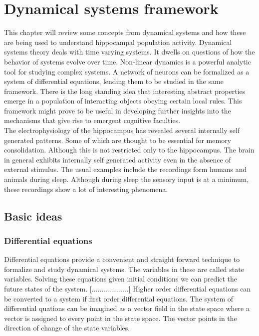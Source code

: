 
\chapter{Dynamical systems framework} %

\label{dynamics} %



This chapter will review some concepts from dynamical systems and how these are being used to understand hippocampal population activity. Dynamical systems theory deals with time varying systems. It dwells on questions of how the behavior of systems evolve over time. Non-linear dynamics is a powerful analytic tool for studying complex systems. A network of neurons can be formalized as a system of differential equations, lending them to be studied in the same framework. There is the long standing idea that interesting abstract properties emerge in a population of interacting objects obeying certain local rules. This framework might prove to be useful in developing further insights into the mechanisms that give rise to emergent cognitive faculties.\\
The electrophysiology of the hippocampus has revealed several internally self generated patterns. Some of which are thought to be essential for memory consolidation. Although this is not restricted only to the hippocampus. The brain in general exhibits internally self generated activity even in the absence of external stimulus. The usual examples include the recordings form humans and animals during sleep. Although during sleep the sensory input is at a minimum, these recordings show a lot of interesting phenomena.
 
\section{Basic ideas}

\subsection{Differential equations}
Differential equations provide a convenient and straight forward technique to formalize and study dynamical systems. 
The variables in these are called state variables. Solving these equations given initial conditions we can predict the future states of the system.
[...................]
Higher order differential equations can be converted to a system if first order differential equations. 
The system of differential quations can be imagined as a vector field in the state space where a vector is assigned to every point in the state space. The vector points in the direction of change of the state variables. 

